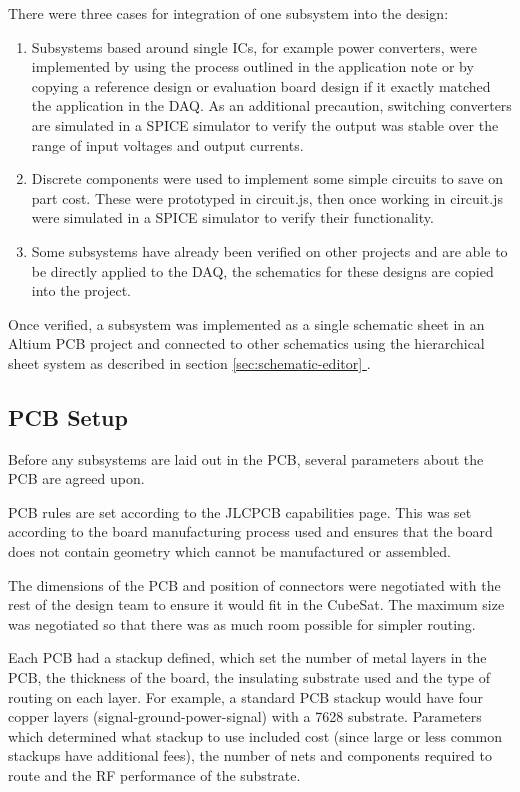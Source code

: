 \documentclass{report}
\newcommand*{\secref}[1]{section \hyperref[{#1}]{\ref*{#1} \nameref*{#1}}}
\begin{document}
There were three cases for integration of one subsystem into the design:

\begin{enumerate}
  \item Subsystems based around single ICs, for example power converters, were implemented by using the process outlined in the application note or by copying a reference design or evaluation board design if it exactly matched the application in the DAQ. As an additional precaution, switching converters are simulated in a SPICE simulator to verify the output was stable over the range of input voltages and output currents.
  \item Discrete components were used to implement some simple circuits to save on part cost. These were prototyped in circuit.js, then once working in circuit.js were simulated in a SPICE simulator to verify their functionality.
  \item Some subsystems have already been verified on other projects and are able to be directly applied to the DAQ, the schematics for these designs are copied into the project.
\end{enumerate}

Once verified, a subsystem was implemented as a single schematic sheet in an Altium PCB project and connected to other schematics using the hierarchical sheet system as described in \secref{sec:schematic-editor}.

\subsection{PCB Setup}

Before any subsystems are laid out in the PCB, several parameters about the PCB are agreed upon.

PCB rules are set according to the JLCPCB capabilities page. This was set according to the board manufacturing process used and ensures that the board does not contain geometry which cannot be manufactured or assembled.

The dimensions of the PCB and position of connectors were negotiated with the rest of the design team to ensure it would fit in the CubeSat. The maximum size was negotiated so that there was as much room possible for simpler routing.

Each PCB had a stackup defined, which set the number of metal layers in the PCB, the thickness of the board, the insulating substrate used and the type of routing on each layer. For example, a standard PCB stackup would have four copper layers (signal-ground-power-signal) with a 7628 substrate. Parameters which determined what stackup to use included cost (since large or less common stackups have additional fees), the number of nets and components required to route and the RF performance of the substrate.
\end{document}
